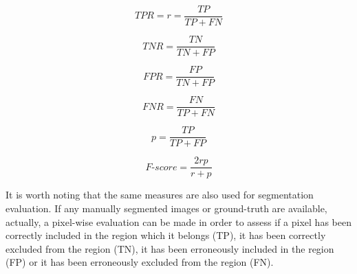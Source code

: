 \documentclass[final,a4paper,12pt,english]{UnicaPhdThesis3}
\begin{document}
\begin{equation}\label{TPR}
TPR = r = \frac{TP}{TP + FN}	
\end{equation}

\begin{equation}\label{TNR}
TNR = \frac{TN}{TN + FP}	
\end{equation}

\begin{equation}\label{FPR}
FPR= \frac{FP}{TN + FP}	
\end{equation}

\begin{equation}\label{FNR}
FNR= \frac{FN}{TP + FN}	
\end{equation}

\begin{equation}\label{precision}
p = \frac{TP}{TP + FP}	
\end{equation}

\begin{equation}\label{Fmeasure}
F\mbox{-}score = \frac{2rp}{r + p}	
\end{equation}

It is worth noting that the same measures are also used for segmentation evaluation. If any manually segmented images or ground-truth are available, actually, a pixel-wise evaluation can be made in order to assess if a pixel has been correctly included in the region which it belongs (TP), it has been correctly excluded from the region (TN), it has been erroneously included in the region (FP) or it has been erroneously excluded from the region (FN).
\end{document}
